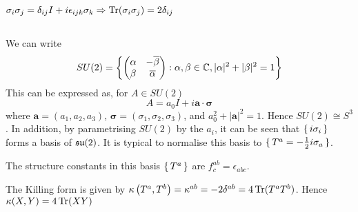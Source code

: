 \documentclass{article}
\begin{document}
\begin{fact}$\sigma_i \sigma_j = \delta_{ij}I +i\epsilon_{ijk}\sigma_k \Rightarrow \operatorname{Tr}(\sigma_i \sigma_j) = 2\delta_{ij}$
\end{fact}

\subsection{}
We can write 
\[
SU(2)=\left\{     \begin{pmatrix} \alpha & -\overline{\beta} \\ \beta & \overline{\alpha} \end{pmatrix}  : \alpha,\beta\in\mathbb{C} , |\alpha|^2+|\beta|^2=1    \right\}
\]
This can be expressed as, for $A\in SU(2)$
\[
A=a_0 I +i\bm{a}\cdot\bm{\sigma}
\]
where $\bm{a}=(a_1, a_2, a_3)$, $\bm{\sigma}=(\sigma_1, \sigma_2, \sigma_3)$, and $a_0^2+|\bm{a}|^2=1$. Hence $SU(2)\cong S^3$. In addition, by parametrising $SU(2)$ by the $a_i$, it can be seen that $\set{  i\sigma_i }$ forms a basis of $\mathfrak{su}(2)$. It is typical to normalise this basis to $\set{  T^a=-\frac{1}{2} i\sigma_a  }$. 

\begin{lemma}
	The structure constants in this basis $\set{  T^a  }$ are $f^{ab}_c=\epsilon_{abc}$.
\end{lemma}

\begin{corollary}
	The Killing form is given by $\kappa\left( T^a,T^b \right) = \kappa^{ab} = -2\delta^{ab} = 4\operatorname{Tr}(T^aT^b)$. Hence $\kappa(X,Y) = 4\operatorname{Tr}(XY)$
\end{corollary}


\end{document}
